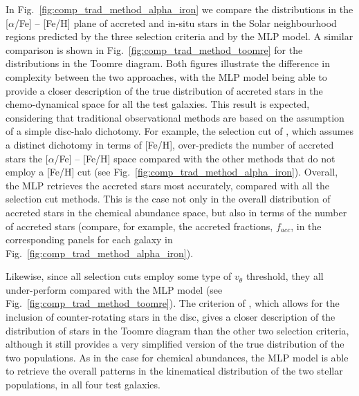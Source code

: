 In Fig.~\ref{fig:comp_trad_method_alpha_iron} we compare the distributions in the [$\alpha$/Fe] -- [Fe/H] plane of accreted and in-situ stars in the Solar neighbourhood regions predicted by the three selection criteria and by the MLP model. A similar comparison is shown in Fig.~\ref{fig:comp_trad_method_toomre} for the distributions in the Toomre diagram. Both figures illustrate the difference in complexity between the two approaches, with the MLP model being able to provide a closer description of the true distribution of accreted stars in the chemo-dynamical space for all the test galaxies. This result is expected, considering that traditional observational methods are based on the assumption of a simple disc-halo dichotomy. For example, the selection cut of \citet{Myeong2018}, which assumes a distinct dichotomy in terms of [Fe/H], over-predicts the number of accreted stars the [$\alpha$/Fe] -- [Fe/H] space compared with the other methods that do not employ a [Fe/H] cut (see Fig.~\ref{fig:comp_trad_method_alpha_iron}). Overall, the MLP retrieves the accreted stars most accurately, compared with all the selection cut methods. This is the case not only in the overall distribution of accreted stars in the chemical abundance space, but also in terms of the number of accreted stars (compare, for example, the accreted fractions, $f_{acc}$, in the corresponding panels for each galaxy in Fig.~\ref{fig:comp_trad_method_alpha_iron}).

Likewise, since all selection cuts employ some type of $v_{\theta}$ threshold, they all under-perform compared with the MLP model (see Fig.~\ref{fig:comp_trad_method_toomre}). The criterion of \citet{Massari2019}, which allows for the inclusion of counter-rotating stars in the disc, gives a closer description of the distribution of stars in the Toomre diagram than the other two selection criteria, although it still provides a very simplified version of the true distribution of the two populations. As in the case for chemical abundances, the MLP model is able to retrieve the overall patterns in the kinematical distribution of the two stellar populations, in all four test galaxies.

